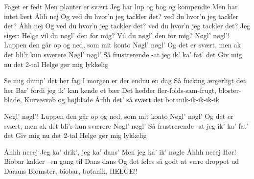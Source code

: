 \documentclass[a4paper,11pt]{article}
\begin{document}
\begin{song}
Faget er fedt
Men planter er svært
Jeg har lup og bog og kompendie  
Men har intet lært
Åhh nej
Og ved du hvor’n jeg tackler det?
ved du hvor’n jeg tackler det?
Åhh nej
Og ved du hvor’n jeg tackler det?
ved du hvor’n jeg tackler det?
Jeg siger:
Helge vil du nøgl’ den for mig?
Vil du nøgl’ den for mig?
Nøgl’ nøgl’!
Luppen den går op og ned, som mit konto
Nøgl’ nøgl’
Og det er svært, men ak det bli’r kun sværere
Nøgl’ nøgl’
Så frustrerende -at jeg ik’ ka’ fat’ det
Giv mig nu det 2-tal
Helge gør mig lykkelig

Se mig dump’ det her fag
I morgen er der endnu en dag
Så fucking ærgerligt det her
Bar’ fordi jeg ik’ kan kende et bær
Det hedder fler-folds-sam-frugt, bloster-blade,
Kurvesvøb og højblade
Århh det’ så svært det botanik-ik-ik-ik-ik

Nøgl’ nøgl’!
Luppen den går op og ned, som mit konto
Nøgl’ nøgl’
Og det er svært, men ak det bli’r kun sværere
Nøgl’ nøgl’
Så frustrerende -at jeg ik’ ka’ fat’ det
Giv mig nu det 2-tal
Helge gør mig lykkelig

Åhhh neeej
Jeg ka’ drik’, jeg ka’ dans’
Men jeg ka’ ik’ nøgle
Åhhh neeej
Hør! Biobar kalder –en gang til
Dans dans
Og det føles så godt at være droppet ud
Daaans
Blomster, biobar, botanik, HELGE!!


\end{song}
\end{document}
